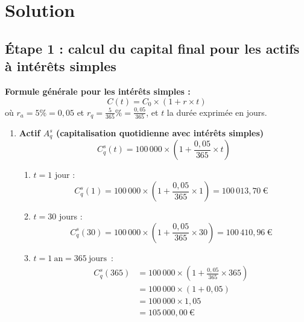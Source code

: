 \documentclass{article}
\begin{document}
\newpage
    
    \section{Solution}
        \subsection*{Étape 1 : calcul du capital final pour les actifs à intérêts simples}
            \noindent
            \textbf{Formule générale pour les intérêts simples :}
            \[
                C(t) = C_0 \times \left(1 + r \times t\right)
            \]
            où $r_a = 5\% = 0,05$ et \( r_q = \frac{5}{365}\% = \frac{0,05}{365} \), et \( t \) la durée exprimée en jours.

            \begin{enumerate}[label=\textbf{R1.\arabic*}]
                \item \textbf{Actif \( A_q^s \) (capitalisation quotidienne avec intérêts simples)}
                \[
                    C_q^s(t) = 100\,000 \times \left(1 + \frac{0,05}{365} \times t\right)
                \]
                \begin{enumerate}[label=(\alph*)]
                    \item \( t = 1 \) jour : 
                    \[
                        C_q^s(1) = 100\,000 \times \left(1 + \frac{0,05}{365} \times 1\right) = \boxed{100\,013,70\ \text{€}}
                    \]

                    \item $t = 30$ jours : 
                    \[
                        C_q^s(30) = 100\,000 \times \left(1 + \frac{0,05}{365} \times 30\right) = \boxed{100\,410,96\ \text{€}}
                    \]

                    \item $t = 1\ \text{an} = 365\ \text{jours}$~: 
                    \begin{align*}
                        C_q^s(365) & = 100\,000 \times \left(1 + \frac{0,05}{365} \times 365\right) \\
                        & = 100\,000 \times (1 + 0,05)                                   \\
                        & = 100\,000 \times 1,05                                         \\
                        & = \boxed{105\,000,00\ \text{€}}                              
                    \end{align*}


\end{enumerate}
\end{enumerate}
\end{document}
